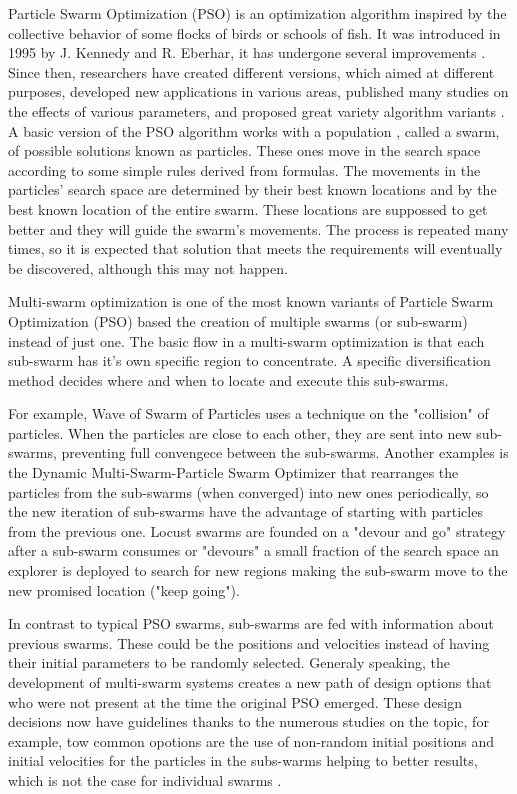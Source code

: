 \documentclass[runningheads]{llncs}
\begin{document}
Particle Swarm Optimization (PSO) is an optimization algorithm
inspired by the collective behavior of some flocks of birds or schools of fish. It was introduced in 1995 by  J. Kennedy and
R. Eberhar, it has undergone several improvements \cite{b1}. %
Since then, researchers have created different versions, which aimed at different
purposes, developed new applications in various areas, published many studies on the effects of various parameters, and proposed great variety algorithm variants \cite{b2}. A basic version of the PSO algorithm
works with a population , called a swarm, of possible solutions
known as particles. These ones move in the search space according to
some simple rules derived from formulas. The movements in the particles' search space are
determined by their best known locations and by the best known location
of the entire swarm. These locations are suppossed to get better and they will
guide the swarm's movements. The process is repeated many times, so it
is expected that solution that meets the requirements will eventually be
discovered, although this may not happen\cite{b3}.

Multi-swarm optimization is one of the most known variants of Particle Swarm Optimization
(PSO) based the creation of multiple swarms (or sub-swarm) instead of just one. The basic flow in
a multi-swarm optimization is that each sub-swarm has it's own specific region to concentrate. A specific diversification method decides where and
when to locate and execute this sub-swarms.

For example, Wave of Swarm of Particles \cite{b6} uses a technique on the "collision" of particles. When the
particles are close to each other, they are sent into new sub-swarms,
preventing full convengece between the sub-swarms. Another examples is the Dynamic Multi-Swarm-Particle
Swarm Optimizer\cite{b7} that rearranges the particles from the sub-swarms
(when converged) into new ones periodically, so the new
iteration of sub-swarms have the advantage of starting with particles from the previous
one. Locust swarms \cite{b8} are founded on a "devour and go" strategy
after a sub-swarm consumes or "devours" a small fraction of the search space an explorer is deployed to search for
new regions making the sub-swarm move to the new promised location ("keep going").

In contrast to typical PSO swarms, sub-swarms are fed with information about
previous swarms. These could be the positions and velocities instead of having
their initial parameters to be randomly selected. Generaly speaking, the development of
multi-swarm systems creates a new path of design options that who were not present at the time the original PSO emerged. 
These design decisions now have guidelines thanks to the numerous studies on the topic, for
example, tow common opotions are the use of non-random initial positions and initial velocities for the particles in the subs-warms helping to
better results, which is not the case for individual swarms \cite{b9}.
\end{document}

